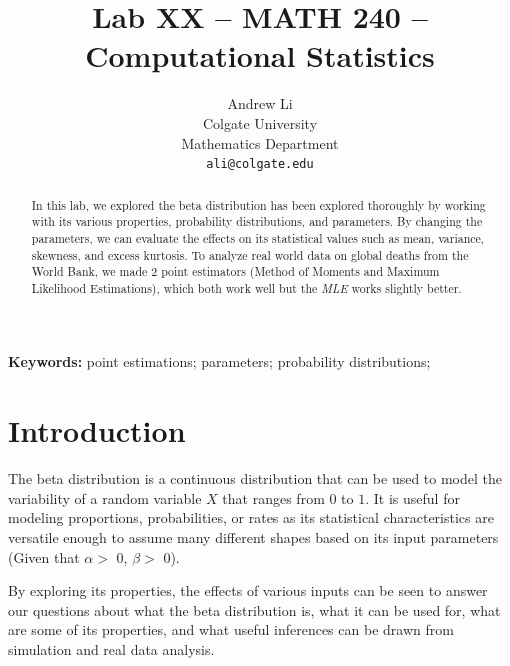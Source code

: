 \documentclass{article}\usepackage[]{graphicx}\usepackage[]{xcolor}
\newenvironment{Figure}
  {\par\medskip\noindent\minipage{\linewidth}}
  {\endminipage\par\medskip}
\begin{document}
\vspace{-1in}
\title{Lab XX -- MATH 240 -- Computational Statistics}

\author{
  Andrew Li \\
  Colgate University  \\
  Mathematics Department  \\
  {\tt ali@colgate.edu}
}

\date{}

\maketitle

\begin{multicols}{2}
\begin{abstract}
In this lab, we explored the beta distribution has been explored thoroughly by working with its various properties, probability distributions, and parameters. By changing the parameters, we can evaluate the effects on its statistical values such as mean, variance, skewness, and excess kurtosis. To analyze real world data on global deaths from the World Bank, we made 2 point estimators (Method of Moments and Maximum Likelihood Estimations), which both work well but the \emph{MLE} works slightly better. 

\end{abstract}

\noindent \textbf{Keywords:} point estimations; parameters; probability distributions; 

\section{Introduction}
The beta distribution is a continuous distribution that can be used to model the variability of a random variable $X$ that ranges from $0$ to $1$. It is useful for modeling proportions, probabilities, or rates as its statistical characteristics are versatile enough to assume many different shapes based on its input parameters (Given that $\alpha >$ 0, $\beta >$ 0). 

By exploring its properties, the effects of various inputs can be seen to answer our questions about what the beta distribution is, what it can be used for, what are some of its properties, and what useful inferences can be drawn from simulation and real data analysis. 




\end{multicols}
\end{document}
